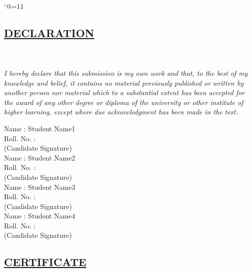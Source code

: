 \bgroup
\catcode`@=11
\gdef\getfontsize{\f@size pt}
\egroup
\newcommand{\normal}{\fontsize{12pt}{16pt}\selectfont}
\newcommand{\size}{\fontsize{14pt}{18pt}\selectfont}
\newcommand{\bigsize}{\fontsize{16pt}{20pt}\selectfont}
\newcommand{\bigbigsize}{\fontsize{20pt}{24pt}\selectfont}
\begin{center}
\section*{\size \underline{\textbf{DECLARATION}}}   
\end{center}\\
\\
\doublespacing
\textit{I hereby declare that this submission is my own work and that, to the best of my knowledge and belief, it contains no material previously published or written by another person nor material which to a substantial extent has been accepted for the award of any other degree or diploma of the university or other institute of higher learning, except where due acknowledgment has been made in the text.}
\\
\begin{flushleft}
Name : Student Name1\\
Roll. No. :   \\
\vspace{5mm}
(Candidate Signature) \\
\vspace{5mm}
Name : Student Name2\\
Roll. No. :   \\
\vspace{5mm}
(Candidate Signature) \\
\vspace{5mm}
Name : Student Name3\\
Roll. No. :   \\
\vspace{5mm}
(Candidate Signature) \\
\vspace{5mm}
Name : Student Name4\\
Roll. No. :   \\
\vspace{5mm}
(Candidate Signature) \\
\vspace{5mm}
\end{flushleft}
\newpage
\begin{center}
\section*{\size \underline {\textbf{CERTIFICATE}}} 
\end{center}\\
